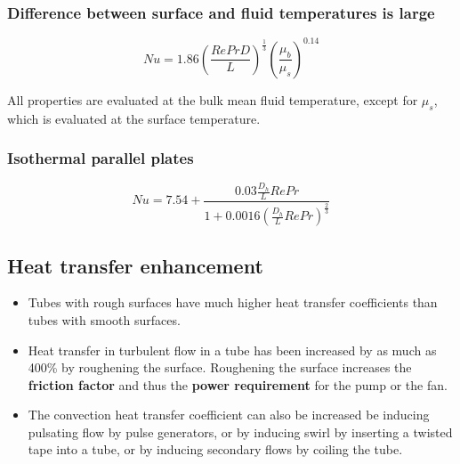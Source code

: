 \documentclass[11pt]{article}
\begin{document}
\subsubsection{Difference between surface and fluid temperatures is large}
\label{sec:orgc4fb24f}
\[Nu = 1.86 \left(\frac{Re Pr D}{L} \right)^{\frac{1}{3}} \left(\frac{\mu_b}{\mu_s} \right)^{0.14}\]

All properties are evaluated at the bulk mean fluid temperature, except for \(\mu_s\), which is evaluated at the surface temperature.

\subsubsection{Isothermal parallel plates}
\label{sec:org0f70de5}
\[Nu = 7.54 + \frac{0.03 \frac{D_h}{L} Re Pr}{1 + 0.0016 \left(\frac{D_h}{L} Re Pr \right)^{\frac{2}{3}}}\]

 \newpage

\subsection{Heat transfer enhancement}
\label{sec:org79f059e}
\begin{itemize}
\item Tubes with rough surfaces have much higher heat transfer coefficients than tubes with smooth surfaces.
\item Heat transfer in turbulent flow in a tube has been increased by as much as 400\% by roughening the surface. Roughening the surface increases the \textbf{friction factor} and thus the \textbf{power requirement} for the pump or the fan.
\item The convection heat transfer coefficient can also be increased be inducing pulsating flow by pulse generators, or by inducing swirl by inserting a twisted tape into a tube, or by inducing secondary flows by coiling the tube.
\end{itemize}
\end{document}
